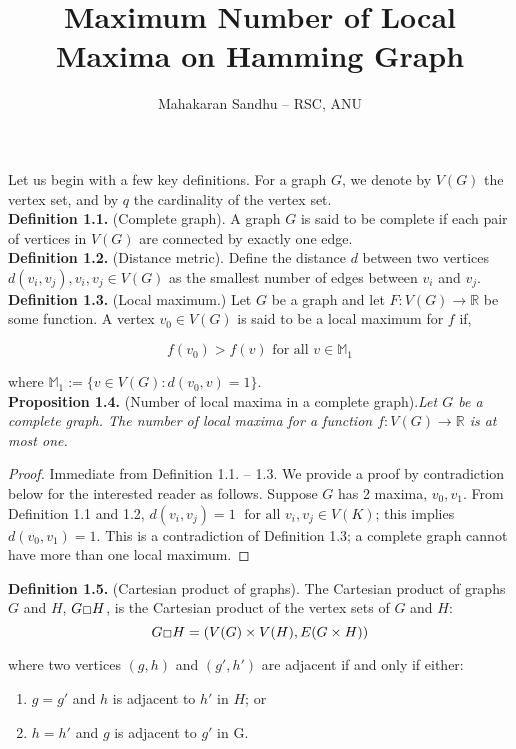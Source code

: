 \documentclass[10pt, reqno]{amsart}
\title{Maximum Number of Local Maxima on Hamming Graph}
\author{Mahakaran Sandhu -- RSC, ANU}
\theoremstyle{plain}
\theoremstyle{definition}
\def\msquare{\mathord{\scalebox{0.35}[0.35]{\scalerel*{\Box}{\strut}}}}
\begin{document}
\maketitle


Let us begin with a few key definitions. For a graph $G$, we denote by $V(G)$ the vertex set, and by $q$ the cardinality of the vertex set. \\

\textbf{Definition 1.1.} (Complete graph). A graph $G$ is said to be complete if each pair of vertices in $V(G)$ are connected by exactly one edge. \\

\textbf{Definition 1.2.} (Distance metric). Define the distance $d$ between two vertices $d(v_i, v_j), v_i, v_j \in V(G)$ as the smallest number of edges between $v_i$ and $v_j$. \\

\textbf{Definition 1.3.} (Local maximum.) Let $G$ be a graph and let $F: V(G) \to \mathbb{R}$ be some function. A vertex $v_0 \in V(G)$ is said to be a local maximum for $f$ if, 

$$f(v_0) > f(v) \text{ for all } v \in \mathbb{M}_1$$

where $\mathbb{M}_1 := \{v \in V(G): d(v_0, v)=1\}$. \\

\textbf{Proposition 1.4.} (Number of local maxima in a complete graph).\textit{Let $G$ be a complete graph. The number of local maxima for a function $f: V(G) \to \mathbb{R}$ is at most one. }

\begin{proof} Immediate from Definition 1.1. -- 1.3. We provide a proof by contradiction below for the interested reader as follows. Suppose $G$ has 2 maxima, $v_0, v_1$. From Definition 1.1 and 1.2, $d(v_i,v_j) = 1 \; \text{ for all } v_i, v_j \in V(K)$; this implies $d(v_0, v_1)=1$. This is a contradiction of Definition 1.3; a complete graph cannot have more than one local maximum. 
\end{proof}



\textbf{Definition 1.5.} (Cartesian product of graphs). The Cartesian product of graphs $G$ and $H$, $G \msquare H$, is the Cartesian product of the vertex sets of $G$ and $H$: 
$$G \msquare H = (V(G) \times V(H), E (G \times H)) $$

where two vertices $(g,h)$ and $(g',h')$ are adjacent if and only if either: 
\begin{enumerate}
\item $g = g'$ and $h$ is adjacent to $h'$ in $H$; or
\item $h=h'$ and $g$ is adjacent to $g'$ in G.
\end{enumerate}
\end{document}
